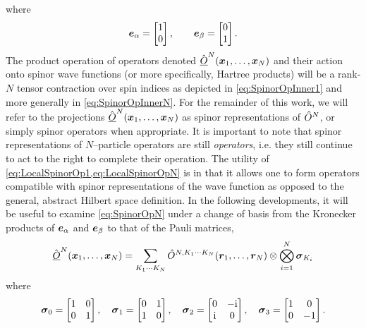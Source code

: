 where 
\begin{align}
\boldsymbol{e}_\alpha = \begin{bmatrix} 1 \\ 0 \end{bmatrix}, \qquad \boldsymbol{e}_\beta = \begin{bmatrix} 0 \\ 1 \end{bmatrix}. 
\end{align}
The product operation of operators denoted $\hat{\underline{O}}^N(\boldsymbol{x}_1,\ldots,\boldsymbol{x}_N)$ and their action onto spinor wave functions 
(or more specifically, Hartree products) will be a rank-$N$ tensor contraction over spin indices as depicted in \cref{eq:SpinorOpInner1} 
and more generally in \cref{eq:SpinorOpInnerN}. 
For the remainder of this work, we will refer to the projections $\hat{\underline{O}}^N(\boldsymbol{x}_1,\ldots,\boldsymbol{x}_N)$ as 
spinor representations of $\hat{O}^N$, or simply spinor operators when appropriate. It is important to note that spinor representations
of $N$--particle operators are still \emph{operators}, i.e. they still continue to act to the right
to complete their operation. The utility of \cref{eq:LocalSpinorOp1,eq:LocalSpinorOpN} is in that it allows one to
form operators compatible with spinor representations of the wave function as opposed to the general, 
abstract Hilbert space definition. 
In the following developments, it will be useful to examine \cref{eq:SpinorOpN} under a change of basis from the Kronecker products of
$\boldsymbol{e}_\alpha$ and $\boldsymbol{e}_\beta$ to that of the Pauli matrices,
\begin{equation}
  \label{eq:SpinorOpPauli}
  \hat{\underline{O}}^N (\boldsymbol{x}_1,\ldots,\boldsymbol{x}_N) = \sum_{K_1\cdots K_N}\hat{O}^{N,K_1\cdots K_N}(\boldsymbol{r}_1,\ldots,\boldsymbol{r}_N) \otimes \bigotimes_{i = 1}^N \boldsymbol{\sigma}_{K_i}
\end{equation}
where 
\begin{equation}
\label{eq:PauliMats}
\boldsymbol{\sigma}_{0} = \begin{bmatrix} 1 & 0 \\ 0 & 1 \end{bmatrix}, \quad
\boldsymbol{\sigma}_{1} = \begin{bmatrix} 0 & 1 \\ 1 & 0 \end{bmatrix}, \quad
\boldsymbol{\sigma}_{2} = \begin{bmatrix} 0 & -\mathrm i \\ \mathrm i & 0 \end{bmatrix}, \quad
\boldsymbol{\sigma}_{3} = \begin{bmatrix} 1 & 0 \\ 0 & -1 \end{bmatrix}.
\end{equation}
